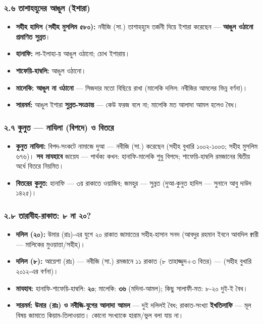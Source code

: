 \subsubsection*{২.৬ তাশাহহুদের আঙুল (ইশারা)}

\begin{itemize}
\item \textbf{সহীহ হাদিস (সহীহ মুসলিম ৫৮০):} নবীজি (সা.) তাশাহহুদে তর্জনী দিয়ে ইশারা করেছেন — \textbf{আঙুল ওঠানো প্রমাণিত সুন্নত}।
\item \textbf{হানাফি:} লা-ইলাহা-য় আঙুল ওঠানো; চোখ ইশারায়।
\item \textbf{শাফেয়ি-হাম্বলি:} আঙুল ওঠানো।
\item \textbf{মালেকি:} \textbf{আঙুল না ওঠানো} — সিজদার মতো বিছিয়ে রাখা (মালেকি দলিল: নবীজির আমলের ভিন্ন বর্ণনা)।
\item \textbf{সারমর্ম:} আঙুল ইশারা \textbf{সুন্নত-সংক্রান্ত} — কেউ ফরজ বলে না; মালেকি মত আলাদা আমল হলেও বৈধ।
\end{itemize}
\subsubsection*{২.৭ কুনুত — নাযিলা (বিপদে) ও বিতরে}

\begin{itemize}
\item \textbf{কুনুত নাযিলা:} বিপদ-সংকটে নামাজে দুআ — নবীজি (সা.) করেছেন (সহীহ বুখারি ১০০২-১০০৩; সহীহ মুসলিম ৬৭৬)। \textbf{সব মাযহাবে} জায়েয — পার্থক্য কখন: হানাফি-মালেকি শুধু বিপদে; শাফেয়ি-হাম্বলি রমজানের দ্বিতীয় অর্ধে বিতরে নিয়মিত।
\item \textbf{বিতরের কুনুত:} হানাফি — ৩য় রাকাতে ওয়াজিব; জমহুর — সুন্নত (দুআ-কুনুত হাদিস — সুনানে আবু দাউদ ১৪২৫)।
\end{itemize}
\subsubsection*{২.৮ তারাবীহ-রাকাত: ৮ না ২০?}

\begin{itemize}
\item \textbf{দলিল (২০):} উমার (রাঃ)-এর যুগে ২০ রাকাত জামাতের সহীহ-হাসান সনদ (আবদুর রহমান ইবনে আবদিল ক্বারী — মালিকের মুওয়াত্তা/সহীহ)।
\item \textbf{দলিল (৮):} আয়েশা (রাঃ) — নবীজি (সা.) রমজানে ১১ রাকাত (৮ তাহাজ্জুদ+৩ বিতর) — (সহীহ বুখারি ২০১২-এর বর্ণনা)।
\item \textbf{মাযহাব:} হানাফি-শাফেয়ি-হাম্বলি: \textbf{২০}; মালেকি: \textbf{৩৬} (মদিনা-আমল); কিছু সালাফী-মত: ৮-২০ দুই-ই বৈধ।
\item \textbf{সারমর্ম:} \textbf{উমার (রাঃ) ও নবীজি-যুগের আলাদা আমল} — দুই দলিলই বৈধ; রাকাত-সংখ্যা \textbf{ইখতিলাফি} — মূল বিষয় জামাতে কিয়াম-তিলাওয়াত। কোনো সংখ্যাকে হারাম/ভুল বলা যায় না।
\end{itemize}
